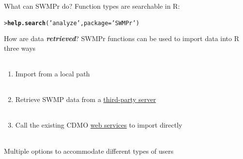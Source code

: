 \documentclass[serif]{beamer}\usepackage[]{graphicx}\usepackage[]{color}
\makeatletter
\newcommand{\hlstr}[1]{\textcolor[rgb]{0.192,0.494,0.8}{#1}}%
\newcommand{\hlstd}[1]{\textcolor[rgb]{0.345,0.345,0.345}{#1}}%
\newcommand{\hlkwc}[1]{\textcolor[rgb]{0.333,0.667,0.333}{#1}}%
\newcommand{\hlkwd}[1]{\textcolor[rgb]{0.737,0.353,0.396}{\textbf{#1}}}%
\newenvironment{kframe}{%
 \def\at@end@of@kframe{}%
 \ifinner\ifhmode%
  \def\at@end@of@kframe{\end{minipage}}%
  \begin{minipage}{\columnwidth}%
 \fi\fi%
 \def\FrameCommand##1{\hskip\@totalleftmargin \hskip-\fboxsep
 \colorbox{shadecolor}{##1}\hskip-\fboxsep
     \hskip-\linewidth \hskip-\@totalleftmargin \hskip\columnwidth}%
 \MakeFramed {\advance\hsize-\width
   \@totalleftmargin\z@ \linewidth\hsize
   \@setminipage}}%
 {\par\unskip\endMakeFramed%
 \at@end@of@kframe}
\newenvironment{knitrout}{}{} %
\newcommand{\Bigtxt}[1]{\textbf{\textit{#1}}}
\makeatother
\begin{document}
\begin{frame}[fragile]{What can SWMPr do?}
Function types are searchable in R:
\begin{knitrout}
\color{fgcolor}\begin{kframe}
\begin{alltt}
\hlstd{> }\hlkwd{help.search}\hlstd{(}\hlstr{'analyze'}\hlstd{,} \hlkwc{package} \hlstd{=} \hlstr{'SWMPr'}\hlstd{)}
\end{alltt}
\end{kframe}
\end{knitrout}
\centerline{}
\end{frame}

\begin{frame}{How are data \Bigtxt{retrieved}?}
SWMPr functions can be used to import data into R three ways\\~\\
\begin{enumerate}
\item Import from a local path \\~\\
\item Retrieve SWMP data from a \href{https://s3.amazonaws.com/swmpalldata/}{third-party server} \\~\\
\item Call the existing CDMO \href{http://cdmo.baruch.sc.edu/webservices.cfm}{web services} to import directly\\~\\
\end{enumerate}
Multiple options to accommodate different types of users
\end{frame}
\end{document}
